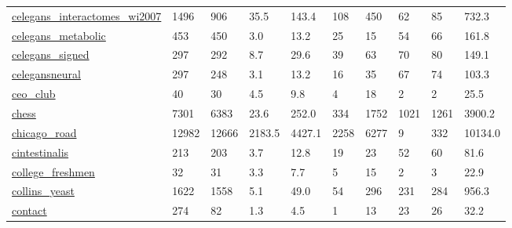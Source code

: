 \begin{longtable}{llllllllll}
 \href{http://interactome.dfci.harvard.edu/C_elegans/index.php?page=download}{celegans\_interactomes\_wi2007}                 & 1496       & 906   & 35.5   & 143.4  & 108   & 450    & 62     & 85     & 732.3   \\
 \href{https://deim.urv.cat/~alexandre.arenas/data/welcome.htm}{celegans\_metabolic}                                         & 453        & 450   & 3.0    & 13.2   & 25    & 15     & 54     & 66     & 161.8   \\
 \href{https://doi.org/10.1016/j.neuron.2021.06.007}{celegans\_signed}                                                       & 297        & 292   & 8.7    & 29.6   & 39    & 63     & 70     & 80     & 149.1   \\
 \href{http://www-personal.umich.edu/~mejn/netdata}{celegansneural}                                                         & 297        & 248   & 3.1    & 13.2   & 16    & 35     & 67     & 74     & 103.3   \\
 \href{http://konect.cc/networks/brunson_club-membership}{ceo\_club}                                                         & 40         & 30    & 4.5    & 9.8    & 4     & 18     & 2      & 2      & 25.5    \\
 \href{http://konect.cc/networks/chess}{chess}                                                                              & 7301       & 6383  & 23.6   & 252.0  & 334   & 1752   & 1021   & 1261   & 3900.2  \\
 \href{http://konect.cc/networks/tntp-ChicagoRegional}{chicago\_road}                                                        & 12982      & 12666 & 2183.5 & 4427.1 & 2258  & 6277   & 9      & 332    & 10134.0 \\
 \href{https://doi.org/10.7554/eLife.16962}{cintestinalis}                                                                  & 213        & 203   & 3.7    & 12.8   & 19    & 23     & 52     & 60     & 81.6    \\
 \href{http://konect.cc/networks/moreno_vdb}{college\_freshmen}                                                              & 32         & 31    & 3.3    & 7.7    & 5     & 15     & 2      & 3      & 22.9    \\
 \href{http://interactome.dfci.harvard.edu/S_cerevisiae/index.php?page=download}{collins\_yeast}                             & 1622       & 1558  & 5.1    & 49.0   & 54    & 296    & 231    & 284    & 956.3   \\
 \href{http://konect.cc/networks/contact}{contact}                                                                          & 274        & 82    & 1.3    & 4.5    & 1     & 13     & 23     & 26     & 32.2    \\

\end{longtable}
